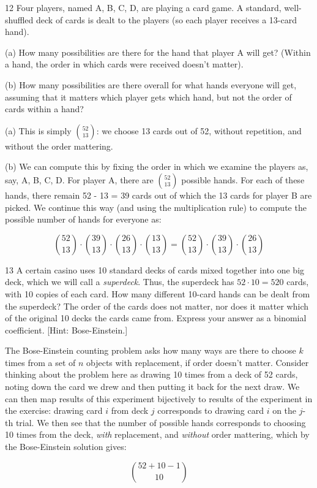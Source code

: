 \begin{exercise}{12}
    Four players, named A, B, C, D, are playing a card game.
    A standard, well-shuffled deck of cards is dealt to the players (so each player receives a 13-card hand).

    (a) How many possibilities are there for the hand that player A will get? (Within a hand, the order in which cards were received doesn't matter).

    (b) How many possibilities are there overall for what hands everyone will get, assuming that it matters which player gets which hand, but not the order of cards within a hand?
\end{exercise}

\begin{solution}
    
    (a) This is simply $\binom{52}{13}$: we choose 13 cards out of 52, without repetition, and without the order mattering.

    (b) We can compute this by fixing the order in which we examine the players as, say, A, B, C, D.
    For player A, there are $\binom{52}{13}$ possible hands.
    For each of these hands, there remain 52 - 13 = 39 cards out of which the 13 cards for player B are picked.
    We continue this way (and using the multiplication rule) to compute the possible number of hands for everyone as:

    \[\binom{52}{13} \cdot \binom{39}{13} \cdot \binom{26}{13} \cdot \binom{13}{13} = \binom{52}{13} \cdot \binom{39}{13} \cdot \binom{26}{13}\]
\end{solution}

\begin{exercise}{13}
    A certain casino uses 10 standard decks of cards mixed together into one big deck, which we will call a \textit{superdeck}.
    Thus, the superdeck has $52 \cdot 10 = 520$ cards, with 10 copies of each card.
    How many different 10-card hands can be dealt from the superdeck?
    The order of the cards does not matter, nor does it matter which of the original 10 decks the cards came from.
    Express your answer as a binomial coefficient.
    [Hint: Bose-Einstein.]
\end{exercise}

\begin{solution}
    
    The Bose-Einstein counting problem asks how many ways are there to choose $k$ times from a set of $n$ objects with replacement, if order doesn't matter.
    Consider thinking about the problem here as drawing 10 times from a deck of 52 cards, noting down the card we drew and then putting it back for the next draw.
    We can then map results of this experiment bijectively to results of the experiment in the exercise: drawing card $i$ from deck $j$ corresponds to drawing card $i$ on the $j$-th trial.
    We then see that the number of possible hands corresponds to choosing 10 times from the deck, \textit{with} replacement, and \textit{without} order mattering, which by the Bose-Einstein solution gives:

    \[\binom{52 + 10 - 1}{10}\]
\end{solution}

